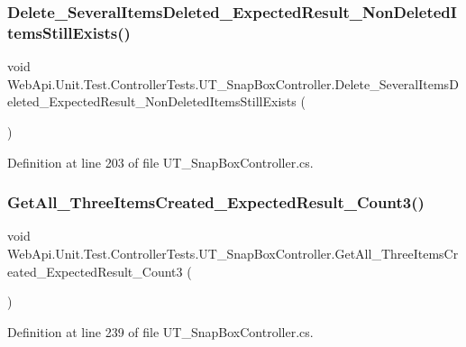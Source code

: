 \subsubsection{\texorpdfstring{Delete\+\_\+\+Several\+Items\+Deleted\+\_\+\+Expected\+Result\+\_\+\+Non\+Deleted\+Items\+Still\+Exists()}{Delete\_SeveralItemsDeleted\_ExpectedResult\_NonDeletedItemsStillExists()}}
{\footnotesize\ttfamily void Web\+Api.\+Unit.\+Test.\+Controller\+Tests.\+U\+T\+\_\+\+Snap\+Box\+Controller.\+Delete\+\_\+\+Several\+Items\+Deleted\+\_\+\+Expected\+Result\+\_\+\+Non\+Deleted\+Items\+Still\+Exists (\begin{DoxyParamCaption}{ }\end{DoxyParamCaption})}



Definition at line 203 of file U\+T\+\_\+\+Snap\+Box\+Controller.\+cs.

\mbox{\label{class_web_api_1_1_unit_1_1_test_1_1_controller_tests_1_1_u_t___snap_box_controller_af2c62e3379625e1d889ba408cae8ddd6}} 
\subsubsection{\texorpdfstring{Get\+All\+\_\+\+Three\+Items\+Created\+\_\+\+Expected\+Result\+\_\+\+Count3()}{GetAll\_ThreeItemsCreated\_ExpectedResult\_Count3()}}
{\footnotesize\ttfamily void Web\+Api.\+Unit.\+Test.\+Controller\+Tests.\+U\+T\+\_\+\+Snap\+Box\+Controller.\+Get\+All\+\_\+\+Three\+Items\+Created\+\_\+\+Expected\+Result\+\_\+\+Count3 (\begin{DoxyParamCaption}{ }\end{DoxyParamCaption})}



Definition at line 239 of file U\+T\+\_\+\+Snap\+Box\+Controller.\+cs.

